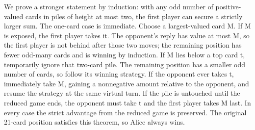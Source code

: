 We prove a stronger statement by induction: with any odd number of positive-valued cards in piles of height at most two, the first player can secure a strictly larger sum. The one-card case is immediate. Choose a largest-valued card M. If M is exposed, the first player takes it. The opponent's reply has value at most M, so the first player is not behind after those two moves; the remaining position has fewer odd-many cards and is winning by induction. If M lies below a top card t, temporarily ignore that two-card pile. The remaining position has a smaller odd number of cards, so follow its winning strategy. If the opponent ever takes t, immediately take M, gaining a nonnegative amount relative to the opponent, and resume the strategy at the same virtual turn. If the pile is untouched until the reduced game ends, the opponent must take t and the first player takes M last. In every case the strict advantage from the reduced game is preserved. The original 21-card position satisfies this theorem, so Alice always wins.
